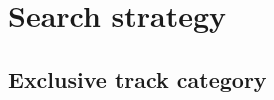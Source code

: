 \clearpage
\section{Search strategy}
\label{sec:search-strategy}

\subsection{Exclusive track category}
\label{sec:exclusive-track-category}
